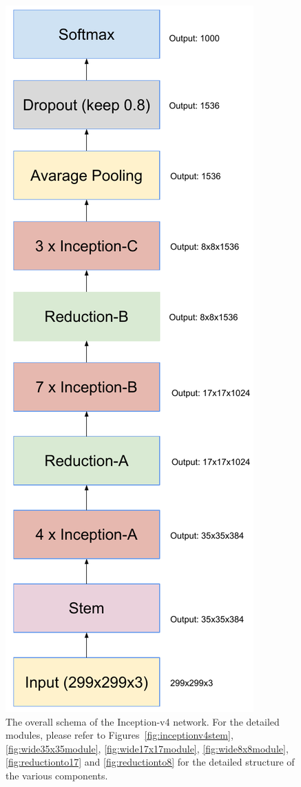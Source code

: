 \begin{figure}
\centering
\includegraphics[width=0.5\linewidth]{inceptionv4}
\caption{The overall schema of the Inception-v4 network. For the
  detailed modules, please refer to Figures~\ref{fig:inceptionv4stem},
  \ref{fig:wide35x35module}, \ref{fig:wide17x17module}, \ref{fig:wide8x8module},
  \ref{fig:reductionto17} and \ref{fig:reductionto8} for the detailed structure
  of the various components.
}
\label{fig:inceptionv4}
\end{figure}
